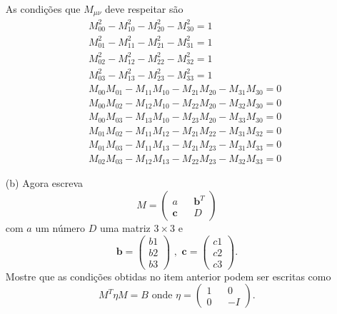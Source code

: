 \documentclass[10pt,a4paper]{article}
\begin{document}
\begin{enumerate}
	As condições que $ M_{\mu\nu} $ deve respeitar são
	\begin{eqnarray}
		&& M_{00}^2-M_{10}^2-M_{20}^2-M_{30}^2 = 1\nonumber \\
		&&M_{01}^2-M_{11}^2-M_{21}^2-M_{31}^2 = 1\nonumber \\
		&&M_{02}^2-M_{12}^2-M_{22}^2-M_{32}^2 = 1 \nonumber \\
		&& M_{03}^2-M_{13}^2-M_{23}^2-M_{33}^2 = 1\nonumber \\
		&& M_{00}M_{01}-M_{11}M_{10}-M_{21}M_{20}-M_{31}M_{30} = 0 \nonumber \\
		&&M_{00}M_{02}- M_{12}M_{10}-M_{22}M_{20}-M_{32}M_{30}= 0 \nonumber \\
		&&M_{00}M_{03}- M_{13}M_{10}-M_{23}M_{20}-M_{33}M_{30} = 0 \nonumber \\
		&&M_{01}M_{02}- M_{11}M_{12}-M_{21}M_{22}- M_{31}M_{32} = 0\nonumber \\
		&& M_{01}M_{03}-M_{11}M_{13}-M_{21}M_{23}-M_{31}M_{33}= 0 \nonumber \\
		&& M_{02}M_{03}-M_{12}M_{13}-M_{22}M_{23}-M_{32}M_{33} = 0  \nonumber
	\end{eqnarray}
	
	\item[(b)] Agora escreva
	\begin{equation}\nonumber
		M =\left(\begin{matrix}
			a && \mathbf{b}^{T} \\
			\mathbf{c} && D
		\end{matrix}\right)
	\end{equation}
com $ a $ um número $ D $ uma matriz $ 3 \times 3 $ e
\begin{equation}\nonumber
	\mathbf{b} = \left(\begin{matrix}
		b1 \\
		b2 \\
		b3
	\end{matrix}\right) \,\, , \,\, 	\mathbf{c} = \left(\begin{matrix}
	c1 \\
	c2 \\
	c3
\end{matrix}\right).
\end{equation}
Mostre que as condições obtidas no item anterior podem ser escritas como
\begin{equation}\nonumber
	M^T\eta M = B \text{   onde } \eta = \left( \begin{matrix}
		1 && 0 \\
		0 && -I
	\end{matrix}\right).
\end{equation}

\end{enumerate}
\end{document}
